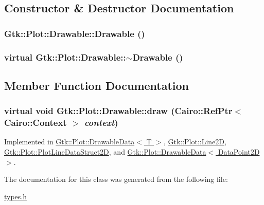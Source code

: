 \subsection{Constructor \& Destructor Documentation}
\hypertarget{classGtk_1_1Plot_1_1Drawable_a22c799e2e10a3f7b60df8568f0d78f20}{
\subsubsection[{Drawable}]{\setlength{\rightskip}{0pt plus 5cm}Gtk::Plot::Drawable::Drawable ()}}
\label{classGtk_1_1Plot_1_1Drawable_a22c799e2e10a3f7b60df8568f0d78f20}
\hypertarget{classGtk_1_1Plot_1_1Drawable_abae99caef51e103d2160ef9a61ca08f9}{
\subsubsection[{$\sim$Drawable}]{\setlength{\rightskip}{0pt plus 5cm}virtual Gtk::Plot::Drawable::$\sim$Drawable ()}}
\label{classGtk_1_1Plot_1_1Drawable_abae99caef51e103d2160ef9a61ca08f9}


\subsection{Member Function Documentation}
\hypertarget{classGtk_1_1Plot_1_1Drawable_ab1c723fcea852515f17d933e66b63ed2}{
\subsubsection[{draw}]{\setlength{\rightskip}{0pt plus 5cm}virtual void Gtk::Plot::Drawable::draw (Cairo::RefPtr$<$ Cairo::Context $>$ {\em context})}}
\label{classGtk_1_1Plot_1_1Drawable_ab1c723fcea852515f17d933e66b63ed2}


Implemented in \hyperlink{classGtk_1_1Plot_1_1DrawableData_a275c0162df2dfdd060e859b63077614c}{Gtk::Plot::DrawableData$<$ T $>$}, \hyperlink{classGtk_1_1Plot_1_1Line2D_a4f5fc46b03bac4dc0a87fe7dd4945cf1}{Gtk::Plot::Line2D}, \hyperlink{structGtk_1_1Plot_1_1PlotLineDataStruct2D_ad3f4c1ed94cc37644032ac3be8995e1d}{Gtk::Plot::PlotLineDataStruct2D}, and \hyperlink{classGtk_1_1Plot_1_1DrawableData_a275c0162df2dfdd060e859b63077614c}{Gtk::Plot::DrawableData$<$ DataPoint2D $>$}.

The documentation for this class was generated from the following file:\begin{DoxyCompactItemize}
\item 
\hyperlink{types_8h}{types.h}\end{DoxyCompactItemize}
